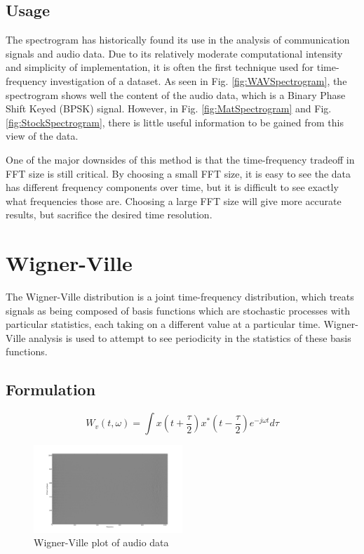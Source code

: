 \documentclass[journal]{IEEEtran}
\begin{document}
\subsection{Usage}
The spectrogram has historically found its use in the analysis of communication signals and audio data. Due to its relatively moderate computational
intensity and simplicity of implementation, it is often the first technique used for time-frequency investigation of a dataset. As seen in Fig.
\ref{fig:WAVSpectrogram}, the spectrogram shows well the content of the audio data, which is a Binary Phase Shift Keyed (BPSK) signal. However, in Fig. 
\ref{fig:MatSpectrogram} and Fig. \ref{fig:StockSpectrogram}, there is little useful information to be gained from this view of the data.

One of the major downsides of this method is that the time-frequency tradeoff in FFT size is still 
critical. By choosing a small FFT size, it is easy to see the data has different frequency components over time, but it is difficult to see exactly
what frequencies those are. Choosing a large FFT size will give more accurate results, but sacrifice the desired time resolution.

\section{Wigner-Ville}
The Wigner-Ville distribution is a joint time-frequency distribution, which treats signals as being composed of basis functions which are stochastic 
processes with particular statistics, each taking on a different value at a particular time. Wigner-Ville analysis is used to attempt to see 
periodicity in the statistics of these basis functions. \cite{WignerPaper}

\subsection{Formulation}
\begin{equation}
    W_v(t,\omega) = \int x(t+\frac{\tau}{2})x^{*}(t-\frac{\tau}{2})e^{-j \omega t}d\tau
    \label{eq:WignerVille}
\end{equation}

\begin{figure}[h!]
\centering
  \includegraphics[width=0.5\textwidth]{wav_wigner_plot.png}
\caption{Wigner-Ville plot of audio data}
\label{fig:WAVWigner}
\end{figure}
\end{document}
